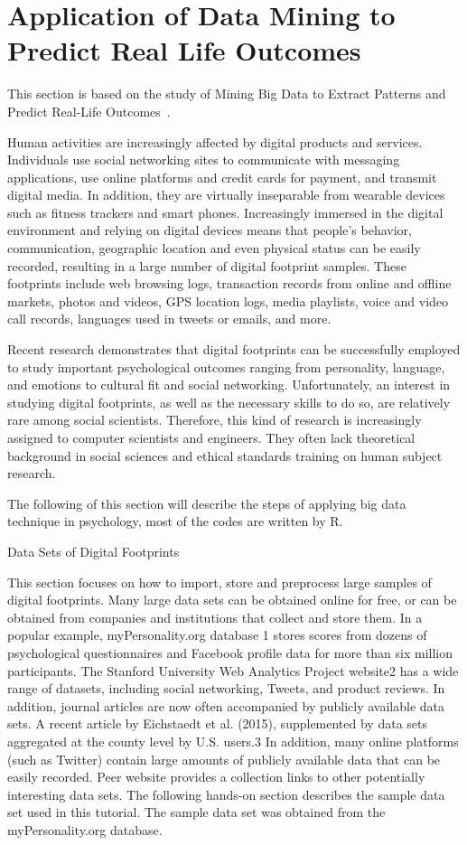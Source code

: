 \section{Application of Data Mining to Predict Real Life Outcomes}

This section is based on the study of Mining Big Data to Extract 
Patterns and Predict Real-Life Outcomes~\cite{editor12}.

Human activities are increasingly affected by digital products and
 services. Individuals use social networking sites to communicate 
with messaging applications, use online platforms and credit cards
 for payment, and transmit digital media. In addition, they are 
virtually inseparable from wearable devices such as fitness 
trackers and smart phones. Increasingly immersed in the digital 
environment and relying on digital devices means that people's 
behavior, communication, geographic location and even physical 
status can be easily recorded, resulting in a large number of 
digital footprint samples. These footprints include web browsing 
logs, transaction records from online and offline markets, photos 
and videos, GPS location logs, media playlists, voice and video 
call records, languages used in tweets or emails, and more.

Recent research demonstrates that digital footprints can be 
successfully employed to study important psychological outcomes 
ranging from personality, language, and emotions to cultural fit
 and social networking. Unfortunately, an interest in studying 
digital footprints, as well as the necessary skills to do so, are 
relatively rare among social scientists. Therefore, this kind of 
research is increasingly assigned to computer scientists and 
engineers. They often lack theoretical background in social 
sciences and ethical standards training on human subject research.

The following of this section will describe the steps of applying 
big data technique in psychology, most of the codes are written by R.

Data Sets of Digital Footprints

This section focuses on how to import, store and preprocess large 
samples of digital footprints. Many large data sets can be obtained
 online for free, or can be obtained from companies and 
institutions that collect and store them. In a popular example, 
myPersonality.org database 1 stores scores from dozens of 
psychological questionnaires and Facebook profile data for more 
than six million participants. The Stanford University Web 
Analytics Project website2 has a wide range of datasets, including
 social networking, Tweets, and product reviews. In addition, 
journal articles are now often accompanied by publicly available 
data sets. A recent article by Eichstaedt et al. (2015), 
supplemented by data sets aggregated at the county level by U.S. 
users.3 In addition, many online platforms (such as Twitter) 
contain large amounts of publicly available data that can be easily 
recorded. Peer website provides a collection links to other 
potentially interesting data sets. The following hands-on section 
describes the sample data set used in this tutorial. The sample 
data set was obtained from the myPersonality.org database.

